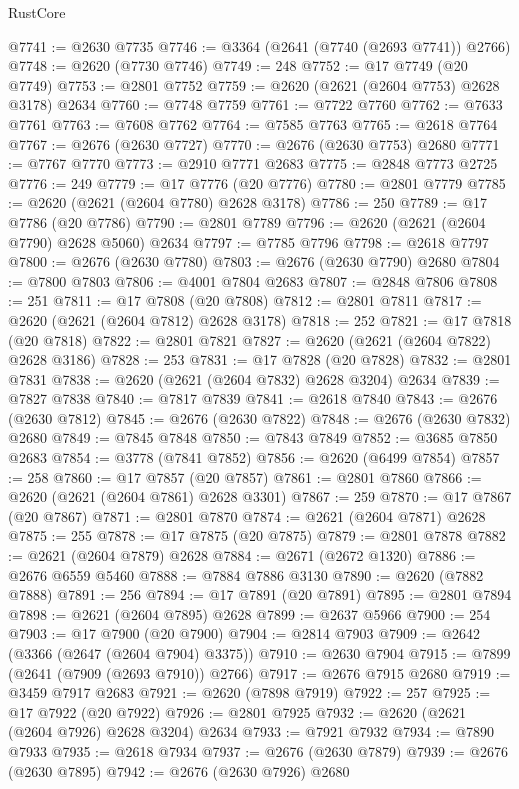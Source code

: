 \begin{lexlean}{RustCore}
\begin{coremodule}
@7741 := @2630 @7735
@7746 := @3364 (@2641 (@7740 (@2693 @7741)) @2766)
@7748 := @2620 (@7730 @7746)
@7749 := 248
@7752 := @17 @7749 (@20 @7749)
@7753 := @2801 @7752
@7759 := @2620 (@2621 (@2604 @7753) @2628 @3178) @2634
@7760 := @7748 @7759
@7761 := @7722 @7760
@7762 := @7633 @7761
@7763 := @7608 @7762
@7764 := @7585 @7763
@7765 := @2618 @7764
@7767 := @2676 (@2630 @7727)
@7770 := @2676 (@2630 @7753) @2680
@7771 := @7767 @7770
@7773 := @2910 @7771 @2683
@7775 := @2848 @7773 @2725
@7776 := 249
@7779 := @17 @7776 (@20 @7776)
@7780 := @2801 @7779
@7785 := @2620 (@2621 (@2604 @7780) @2628 @3178)
@7786 := 250
@7789 := @17 @7786 (@20 @7786)
@7790 := @2801 @7789
@7796 := @2620 (@2621 (@2604 @7790) @2628 @5060) @2634
@7797 := @7785 @7796
@7798 := @2618 @7797
@7800 := @2676 (@2630 @7780)
@7803 := @2676 (@2630 @7790) @2680
@7804 := @7800 @7803
@7806 := @4001 @7804 @2683
@7807 := @2848 @7806
@7808 := 251
@7811 := @17 @7808 (@20 @7808)
@7812 := @2801 @7811
@7817 := @2620 (@2621 (@2604 @7812) @2628 @3178)
@7818 := 252
@7821 := @17 @7818 (@20 @7818)
@7822 := @2801 @7821
@7827 := @2620 (@2621 (@2604 @7822) @2628 @3186)
@7828 := 253
@7831 := @17 @7828 (@20 @7828)
@7832 := @2801 @7831
@7838 := @2620 (@2621 (@2604 @7832) @2628 @3204) @2634
@7839 := @7827 @7838
@7840 := @7817 @7839
@7841 := @2618 @7840
@7843 := @2676 (@2630 @7812)
@7845 := @2676 (@2630 @7822)
@7848 := @2676 (@2630 @7832) @2680
@7849 := @7845 @7848
@7850 := @7843 @7849
@7852 := @3685 @7850 @2683
@7854 := @3778 (@7841 @7852)
@7856 := @2620 (@6499 @7854)
@7857 := 258
@7860 := @17 @7857 (@20 @7857)
@7861 := @2801 @7860
@7866 := @2620 (@2621 (@2604 @7861) @2628 @3301)
@7867 := 259
@7870 := @17 @7867 (@20 @7867)
@7871 := @2801 @7870
@7874 := @2621 (@2604 @7871) @2628
@7875 := 255
@7878 := @17 @7875 (@20 @7875)
@7879 := @2801 @7878
@7882 := @2621 (@2604 @7879) @2628
@7884 := @2671 (@2672 @1320)
@7886 := @2676 @6559 @5460
@7888 := @7884 @7886 @3130
@7890 := @2620 (@7882 @7888)
@7891 := 256
@7894 := @17 @7891 (@20 @7891)
@7895 := @2801 @7894
@7898 := @2621 (@2604 @7895) @2628
@7899 := @2637 @5966
@7900 := 254
@7903 := @17 @7900 (@20 @7900)
@7904 := @2814 @7903
@7909 := @2642 (@3366 (@2647 (@2604 @7904) @3375))
@7910 := @2630 @7904
@7915 := @7899 (@2641 (@7909 (@2693 @7910)) @2766)
@7917 := @2676 @7915 @2680
@7919 := @3459 @7917 @2683
@7921 := @2620 (@7898 @7919)
@7922 := 257
@7925 := @17 @7922 (@20 @7922)
@7926 := @2801 @7925
@7932 := @2620 (@2621 (@2604 @7926) @2628 @3204) @2634
@7933 := @7921 @7932
@7934 := @7890 @7933
@7935 := @2618 @7934
@7937 := @2676 (@2630 @7879)
@7939 := @2676 (@2630 @7895)
@7942 := @2676 (@2630 @7926) @2680

\end{coremodule}
\end{lexlean}
